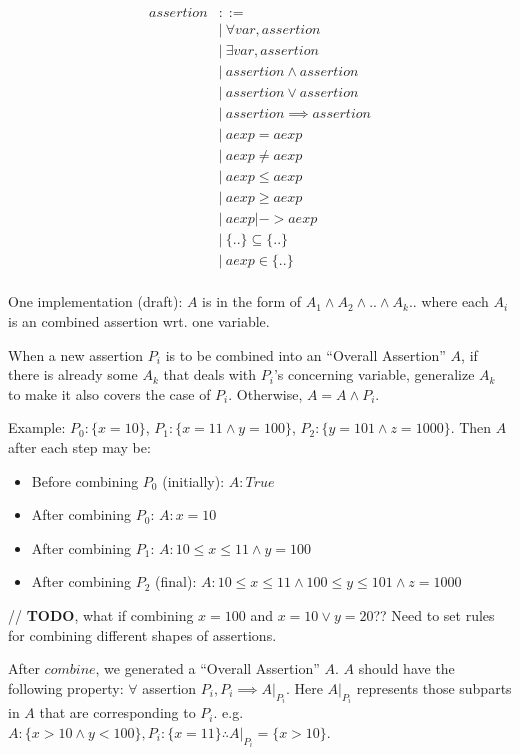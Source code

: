 \documentclass[12pt, fleqn]{article}
\begin{document}
\begin{equation*}
\begin{aligned}
assertion &::=\\
&| \ \forall var, assertion\\
&| \ \exists var, assertion\\
&| \ assertion \land assertion\\
&| \ assertion \lor assertion\\
&| \ assertion \implies assertion\\
&| \ aexp = aexp\\
&| \ aexp \neq aexp\\
&| \ aexp \le aexp\\
&| \ aexp \ge aexp\\
&| \ aexp |-> aexp\\
&| \ \{ .. \} \subseteq \{ .. \}\\
&| \ aexp \in \{ .. \}\\
\end{aligned}
\end{equation*}

One implementation (draft): $A$ is in the form of $A_1 \land A_2 \land
.. \land A_k ..$ where each $A_i$ is an combined assertion wrt. one
variable.

When a new assertion $P_i$ is to be combined into an ``Overall
Assertion'' $A$, if there is already some $A_k$ that deals with
$P_i$'s concerning variable, generalize $A_k$ to make it also covers
the case of $P_i$. Otherwise, $A = A \land P_i$.

Example: $P_0: \{ x = 10 \}$, $P_1: \{ x = 11 \land y = 100\}$, $P_2: \{ y = 101 \land z = 1000 \}$. Then $A$ after each step may be:

\begin{itemize}
\item Before combining $P_0$ (initially): $A: True$
\item After combining $P_0$: $A: x = 10$
\item After combining $P_1$: $A: 10 \le x \le 11 \land y = 100$
\item After combining $P_2$ (final): $A: 10 \le x \le 11 \land 100 \le y \le 101 \land z = 1000 $
\end{itemize}

// \textbf{TODO}, what if combining $x = 100$ and $x = 10 \lor y =
20$??  Need to set rules for combining different shapes of assertions.

\bigskip

After $combine$, we generated a ``Overall Assertion'' $A$. $A$ should
have the following property: $\forall$ assertion $P_i, P_i \implies
A|_{P_i}$.  Here $A|_{P_i}$ represents those subparts in $A$ that are
corresponding to $P_i$. e.g. $A: \{x > 10 \land y < 100\}, P_i: \{x =
11\} \therefore A|_{P_i} = \{x > 10\}$.
\end{document}
